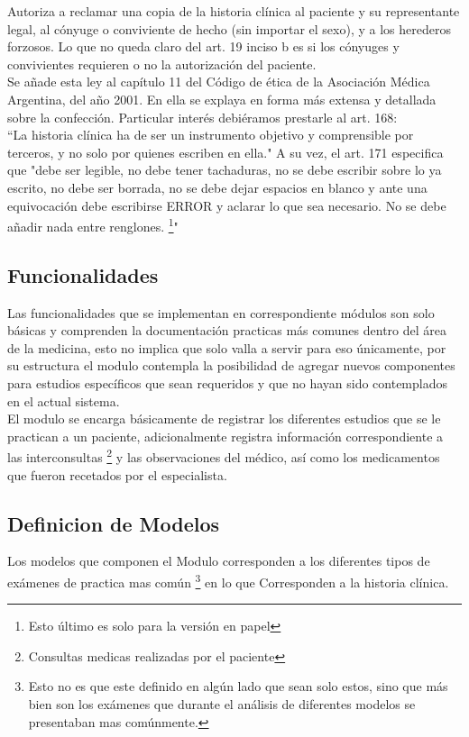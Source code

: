 Autoriza a reclamar una copia de la historia clínica al paciente y su representante legal, al cónyuge o conviviente de hecho (sin importar el sexo), y a los herederos forzosos. Lo que no queda claro del art. 19 inciso b es si los cónyuges y convivientes requieren o no la autorización del paciente.\\[0.1cm]

Se añade esta ley al capítulo 11 del Código de ética de la Asociación Médica Argentina, del año 2001. En ella se explaya en forma más extensa y detallada sobre la confección. Particular interés debiéramos prestarle al art. 168:\\[0.1cm]

``La historia clínica ha de ser un instrumento objetivo y comprensible por terceros, y no solo por quienes escriben en ella." A su vez, el art. 171 especifica que "debe ser legible, no debe tener tachaduras, no se debe escribir sobre lo ya escrito, no debe ser borrada, no se debe dejar espacios en blanco y ante una equivocación debe escribirse ERROR y aclarar lo que sea necesario. No se debe añadir nada entre renglones. \footnote{Esto último es solo para la versión en papel}"


\subsection{Funcionalidades}

Las funcionalidades que se implementan en correspondiente módulos son solo básicas y comprenden la documentación practicas más comunes dentro del área de la medicina, esto no implica que solo valla a servir para eso únicamente, por su estructura el modulo contempla la posibilidad de agregar nuevos componentes para estudios específicos que sean requeridos y que no hayan sido contemplados en el actual sistema.\\[0.1cm]

El modulo se encarga básicamente de registrar los diferentes estudios que se le practican a un paciente, adicionalmente registra información correspondiente a las interconsultas \footnote{Consultas medicas realizadas por el paciente} y las observaciones del médico, así como los medicamentos que fueron recetados por el especialista.


\subsection{Definicion de Modelos}

Los modelos que componen el Modulo corresponden a los diferentes tipos de exámenes de practica mas común \footnote{Esto no es que este definido en algún lado que sean solo estos, sino que más bien son los exámenes que durante el análisis de diferentes modelos se presentaban mas comúnmente.} en lo que 
Corresponden a la historia clínica.\\[0.1cm]

